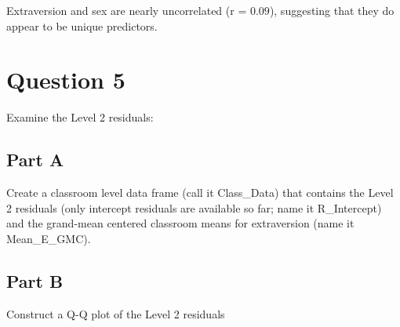 \documentclass[]{article}
\newenvironment{Shaded}{\begin{snugshade}}{\end{snugshade}}
\newcommand{\KeywordTok}[1]{\textcolor[rgb]{0.13,0.29,0.53}{\textbf{#1}}}
\newcommand{\DataTypeTok}[1]{\textcolor[rgb]{0.13,0.29,0.53}{#1}}
\newcommand{\StringTok}[1]{\textcolor[rgb]{0.31,0.60,0.02}{#1}}
\newcommand{\OperatorTok}[1]{\textcolor[rgb]{0.81,0.36,0.00}{\textbf{#1}}}
\newcommand{\NormalTok}[1]{#1}
\begin{document}
Extraversion and sex are nearly uncorrelated (r = \(0.09\)), suggesting
that they do appear to be unique predictors.

\section{Question 5}\label{question-5}

Examine the Level 2 residuals:

\subsection{Part A}\label{part-a-2}

Create a classroom level data frame (call it Class\_Data) that contains
the Level 2 residuals (only intercept residuals are available so far;
name it R\_Intercept) and the grand-mean centered classroom means for
extraversion (name it Mean\_E\_GMC).

\begin{Shaded}
\end{Shaded}

\subsection{Part B}\label{part-b-2}

Construct a Q-Q plot of the Level 2 residuals
\end{document}

